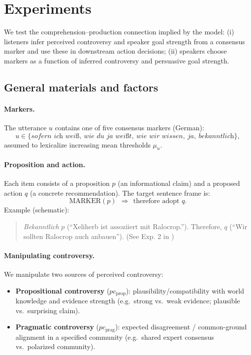 \documentclass[12pt]{article}
\begin{document}
\section{Experiments}

We test the comprehension--production connection implied by the model: (i) listeners infer perceived controversy and speaker goal strength from a consensus marker and use these in downstream action decisions; (ii) speakers choose markers as a function of inferred controversy and persuasive goal strength.

\subsection{General materials and factors}

\paragraph{Markers.}
The utterance $u$ contains one of five consensus markers (German):
\[
u \in \{\textit{sofern ich weiß},\ \textit{wie du ja weißt},\ \textit{wie wir wissen},\ \textit{ja},\ \textit{bekanntlich}\},
\]
assumed to lexicalize increasing mean thresholds $\mu_u$.

\paragraph{Proposition and action.}
Each item consists of a proposition $p$ (an informational claim) and a proposed action $q$ (a concrete recommendation). The target sentence frame is:
\[
\text{MARKER}(p)\ \ \Rightarrow\ \ \text{therefore adopt } q.
\]
Example (schematic):
\begin{quote}
\small
\textit{Bekanntlich} $p$ (``Xeliherb ist assoziiert mit Ralocrop.''). Therefore, $q$ (``Wir sollten Ralocrop auch anbauen''). (See Exp. 2 in \citet{lassiter2024rationality})
\end{quote}

\paragraph{Manipulating controversy.}
We manipulate two sources of perceived controversy:
\begin{itemize}
\item \textbf{Propositional controversy} ($pc_{\text{prop}}$): plausibility/compatibility with world knowledge and evidence strength (e.g.\ strong vs.\ weak evidence; plausible vs.\ surprising claim).
\item \textbf{Pragmatic controversy} ($pc_{\text{prag}}$): expected disagreement / common-ground alignment in a specified community (e.g.\ shared expert consensus vs.\ polarized community).
\end{itemize}
\end{document}
